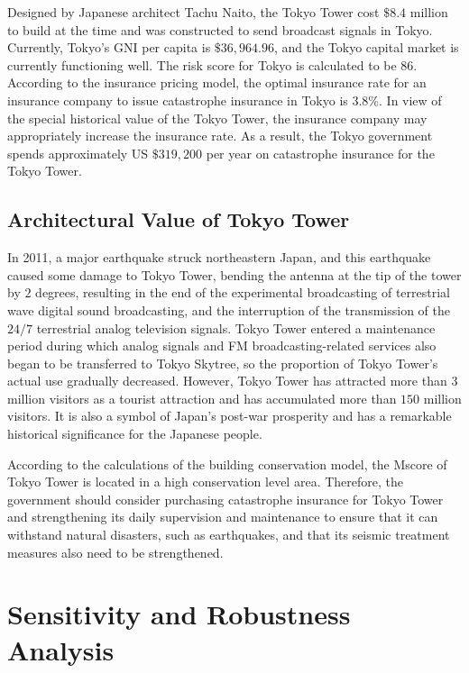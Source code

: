 \documentclass{mcmthesis}
\begin{document}
Designed by Japanese architect Tachu Naito, the Tokyo Tower cost $\$8.4$ million to build
at the time and was constructed to send broadcast signals in Tokyo. Currently, Tokyo's GNI
per capita is $\$36,964.96$, and the Tokyo capital market is currently functioning well. The risk
score for Tokyo is calculated to be 86. According to the insurance pricing model, the optimal
insurance rate for an insurance company to issue catastrophe insurance in Tokyo is $3.8\%$. In
view of the special historical value of the Tokyo Tower, the insurance company may appropriately
increase the insurance rate. As a result, the Tokyo government spends approximately US
$\$319,200$ per year on catastrophe insurance for the Tokyo Tower.

\subsection{Architectural Value of Tokyo Tower}

In 2011, a major earthquake struck northeastern Japan, and this earthquake caused some
damage to Tokyo Tower, bending the antenna at the tip of the tower by $2$ degrees, resulting in
the end of the experimental broadcasting of terrestrial wave digital sound broadcasting, and the
interruption of the transmission of the $24/7$ terrestrial analog television signals. 
Tokyo Tower entered a maintenance period during which analog signals and FM broadcasting-related services
also began to be transferred to Tokyo Skytree, so the proportion of Tokyo Tower's actual
use gradually decreased. However, Tokyo Tower has attracted more than $3$ million visitors as
a tourist attraction and has accumulated more than $150$ million visitors. It is also a symbol of
Japan's post-war prosperity and has a remarkable historical significance for the Japanese people.

According to the calculations of the building conservation model, the Mscore of Tokyo
Tower is located in a high conservation level area. Therefore, the government should consider
purchasing catastrophe insurance for Tokyo Tower and strengthening its daily supervision and
maintenance to ensure that it can withstand natural disasters, such as earthquakes, and that its
seismic treatment measures also need to be strengthened.

\section{Sensitivity and Robustness Analysis}
\end{document}
